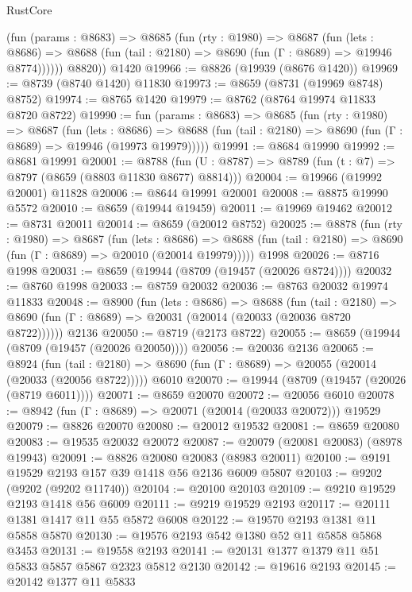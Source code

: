 \begin{lexlean}{RustCore}
\begin{coremodule}
          (fun (params : @8683) =>
          @8685
            (fun (rty : @1980) =>
            @8687
              (fun (lets : @8686) =>
              @8688 (fun (tail : @2180) => @8690 (fun (Γ : @8689) => @19946 @8774))))))
        @8820))
    @1420
@19966 := @8826 (@19939 (@8676 @1420))
@19969 := @8739 (@8740 @1420) @11830
@19973 := @8659 (@8731 (@19969 @8748) @8752)
@19974 := @8765 @1420
@19979 := @8762 (@8764 @19974 @11833 @8720 @8722)
@19990 := fun (params : @8683) =>
  @8685
    (fun (rty : @1980) =>
    @8687
      (fun (lets : @8686) =>
      @8688 (fun (tail : @2180) => @8690 (fun (Γ : @8689) => @19946 (@19973 @19979)))))
@19991 := @8684 @19990
@19992 := @8681 @19991
@20001 := @8788
    (fun (U : @8787) => @8789 (fun (t : @7) => @8797 (@8659 (@8803 @11830 @8677) @8814)))
@20004 := @19966 (@19992 @20001) @11828
@20006 := @8644 @19991 @20001
@20008 := @8875 @19990 @5572
@20010 := @8659 (@19944 @19459)
@20011 := @19969 @19462
@20012 := @8731 @20011
@20014 := @8659 (@20012 @8752)
@20025 := @8878
    (fun (rty : @1980) =>
    @8687
      (fun (lets : @8686) =>
      @8688 (fun (tail : @2180) => @8690 (fun (Γ : @8689) => @20010 (@20014 @19979)))))
    @1998
@20026 := @8716 @1998
@20031 := @8659 (@19944 (@8709 (@19457 (@20026 @8724))))
@20032 := @8760 @1998
@20033 := @8759 @20032
@20036 := @8763 @20032 @19974 @11833
@20048 := @8900
    (fun (lets : @8686) =>
    @8688
      (fun (tail : @2180) =>
      @8690 (fun (Γ : @8689) => @20031 (@20014 (@20033 (@20036 @8720 @8722))))))
    @2136
@20050 := @8719 (@2173 @8722)
@20055 := @8659 (@19944 (@8709 (@19457 (@20026 @20050))))
@20056 := @20036 @2136
@20065 := @8924
    (fun (tail : @2180) => @8690 (fun (Γ : @8689) => @20055 (@20014 (@20033 (@20056 @8722)))))
    @6010
@20070 := @19944 (@8709 (@19457 (@20026 (@8719 @6011))))
@20071 := @8659 @20070
@20072 := @20056 @6010
@20078 := @8942 (fun (Γ : @8689) => @20071 (@20014 (@20033 @20072))) @19529
@20079 := @8826 @20070
@20080 := @20012 @19532
@20081 := @8659 @20080
@20083 := @19535 @20032 @20072
@20087 := @20079 (@20081 @20083) (@8978 @19943)
@20091 := @8826 @20080 @20083 (@8983 @20011)
@20100 := @9191 @19529 @2193 @157 @39 @1418 @56 @2136 @6009 @5807
@20103 := @9202 (@9202 (@9202 @11740))
@20104 := @20100 @20103
@20109 := @9210 @19529 @2193 @1418 @56 @6009
@20111 := @9219 @19529 @2193
@20117 := @20111 @1381 @1417 @11 @55 @5872 @6008
@20122 := @19570 @2193 @1381 @11 @5858 @5870
@20130 := @19576 @2193 @542 @1380 @52 @11 @5858 @5868 @3453
@20131 := @19558 @2193
@20141 := @20131 @1377 @1379 @11 @51 @5833 @5857 @5867 @2323 @5812 @2130
@20142 := @19616 @2193
@20145 := @20142 @1377 @11 @5833

\end{coremodule}
\end{lexlean}
